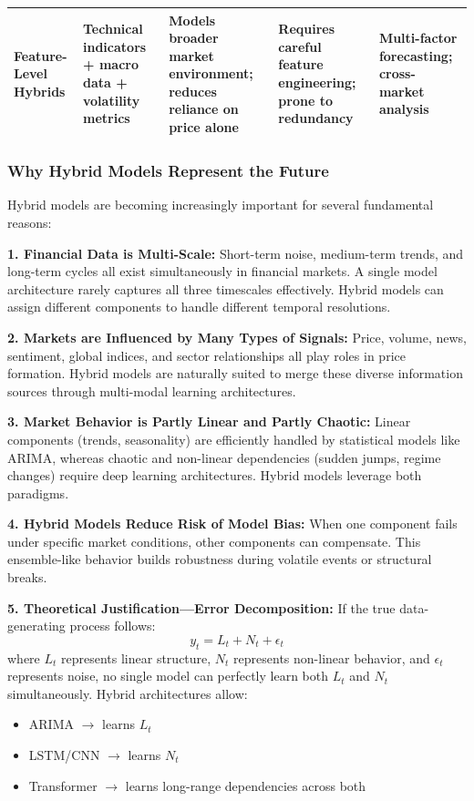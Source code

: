 \begin{table}[htbp]
\begin{tabular}{@{}p{2.5cm}p{2.5cm}p{3cm}p{2.5cm}p{2.5cm}@{}}
Feature-Level Hybrids & Technical indicators + macro data + volatility metrics & Models broader market environment; reduces reliance on price alone & Requires careful feature engineering; prone to redundancy & Multi-factor forecasting; cross-market analysis \\

\bottomrule
\end{tabular}
\end{table}

\subsubsection{Why Hybrid Models Represent the Future}

Hybrid models are becoming increasingly important for several fundamental reasons:

\textbf{1. Financial Data is Multi-Scale:}
Short-term noise, medium-term trends, and long-term cycles all exist simultaneously in financial markets. A single model architecture rarely captures all three timescales effectively. Hybrid models can assign different components to handle different temporal resolutions.

\textbf{2. Markets are Influenced by Many Types of Signals:}
Price, volume, news, sentiment, global indices, and sector relationships all play roles in price formation. Hybrid models are naturally suited to merge these diverse information sources through multi-modal learning architectures.

\textbf{3. Market Behavior is Partly Linear and Partly Chaotic:}
Linear components (trends, seasonality) are efficiently handled by statistical models like ARIMA, whereas chaotic and non-linear dependencies (sudden jumps, regime changes) require deep learning architectures. Hybrid models leverage both paradigms.

\textbf{4. Hybrid Models Reduce Risk of Model Bias:}
When one component fails under specific market conditions, other components can compensate. This ensemble-like behavior builds robustness during volatile events or structural breaks.

\textbf{5. Theoretical Justification---Error Decomposition:}
If the true data-generating process follows:
\begin{equation}
y_t = L_t + N_t + \epsilon_t
\end{equation}
where $L_t$ represents linear structure, $N_t$ represents non-linear behavior, and $\epsilon_t$ represents noise, no single model can perfectly learn both $L_t$ and $N_t$ simultaneously. Hybrid architectures allow:
\begin{itemize}
    \item ARIMA $\rightarrow$ learns $L_t$
    \item LSTM/CNN $\rightarrow$ learns $N_t$
    \item Transformer $\rightarrow$ learns long-range dependencies across both
\end{itemize}

